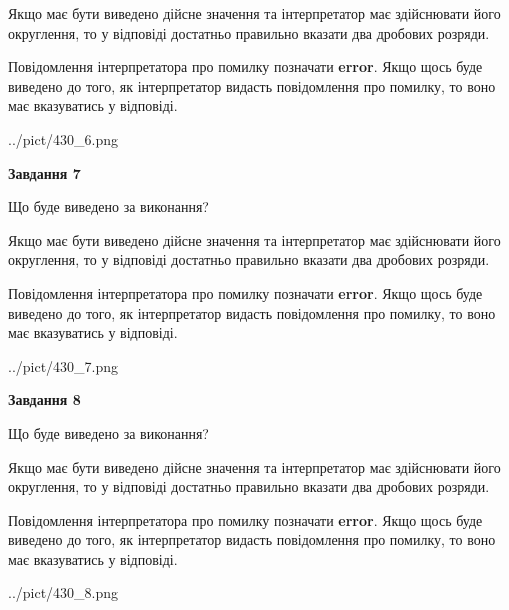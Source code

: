 \documentclass[12pt, ukrainian]{article}
\begin{document}
{\begin {Large}
Якщо має бути виведено дійсне значення та інтерпретатор має здійснювати його округлення, 
то у відповіді достатньо правильно вказати два дробових розряди.

Повідомлення інтерпретатора про помилку позначати \textbf{error}.
Якщо щось буде виведено до того, як інтерпретатор видасть повідомлення про помилку, 
то воно має вказуватись у відповіді. \par

\begin{center}
	{../pict/430_6.png}
\end{center}
\newpage

{\begin {center}\textbf{Завдання 7}\end {center}}\par
Що буде виведено за виконання? \par

Якщо має бути виведено дійсне значення та інтерпретатор має здійснювати його округлення, 
то у відповіді достатньо правильно вказати два дробових розряди.

Повідомлення інтерпретатора про помилку позначати \textbf{error}.
Якщо щось буде виведено до того, як інтерпретатор видасть повідомлення про помилку, 
то воно має вказуватись у відповіді. \par

\begin{center}
	{../pict/430_7.png}
\end{center}
\newpage

{\begin {center}\textbf{Завдання 8}\end {center}}\par
Що буде виведено за виконання? \par

Якщо має бути виведено дійсне значення та інтерпретатор має здійснювати його округлення, 
то у відповіді достатньо правильно вказати два дробових розряди.

Повідомлення інтерпретатора про помилку позначати \textbf{error}.
Якщо щось буде виведено до того, як інтерпретатор видасть повідомлення про помилку, 
то воно має вказуватись у відповіді. \par

\begin{center}
	{../pict/430_8.png}
\end{center}
\newpage


\end{Large}}
\end{document}
